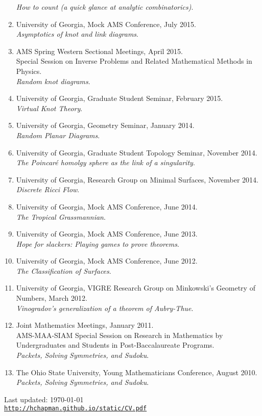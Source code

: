 \documentclass[letterpaper]{article}
\def\footerlink{http://hchapman.github.io/static/CV.pdf}
\begin{document}
\begin{enumerate}
  \textit{How to count (a quick glance at analytic combinatorics)}.
\item University of Georgia, Mock AMS Conference, July 2015.\\
  \textit{Asymptotics of knot and link diagrams}.
\item AMS Spring Western Sectional Meetings, April 2015.\\
  Special Session on Inverse Problems and Related Mathematical Methods in Physics. \\
  \textit{Random knot diagrams}.
\item University of Georgia, Graduate Student Seminar, February
  2015.\\
  \textit{Virtual Knot Theory}.
\item University of Georgia, Geometry Seminar, January 2014.\\
  \textit{Random Planar Diagrams}.
\item University of Georgia, Graduate Student Topology Seminar,
  November 2014.\\
  \textit{The Poincar\'e homolgy sphere as the link of a singularity}.
\item University of Georgia, Research Group on
  Minimal Surfaces, November 2014.\\
  \textit{Discrete Ricci Flow}.
\item University of Georgia, Mock AMS Conference, June 2014.\\
  \textit{The Tropical Grassmannian}.
\item University of Georgia, Mock AMS Conference, June 2013.\\
  \textit{Hope for slackers: Playing games to prove theorems}.
\item University of Georgia, Mock AMS Conference, June 2012.\\
  \textit{The Classification of Surfaces}.
\item University of Georgia, VIGRE Research Group on Minkowski's
  Geometry of Numbers, March 2012.\\
  \textit{Vinogradov's generalization of a theorem of Aubry-Thue}.
\item Joint Mathematics Meetings, January 2011.\\
  AMS-MAA-SIAM Special Session on Research in Mathematics by
  Undergraduates and Students in Post-Baccalaureate Programs.\\
  \textit{Packets, Solving Symmetries, and Sudoku}.
\item The Ohio State University, Young Mathematicians Conference,
  August 2010.\\
  \textit{Packets, Solving Symmetries, and Sudoku}.
\end{enumerate}

\bigskip

\begin{center}
  \begin{footnotesize}
    Last updated: \today \\
    \href{\footerlink}{\texttt{\footerlink}}
  \end{footnotesize}
\end{center}
\end{document}
